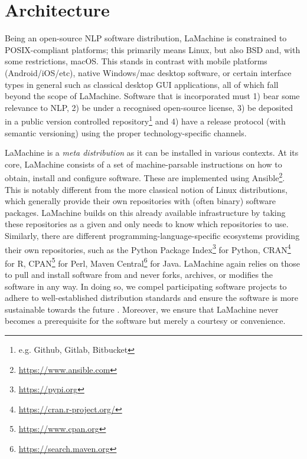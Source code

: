 \documentclass[a4paper,11pt]{article}
\begin{document}
\section{Architecture}

Being an open-source NLP software distribution, LaMachine is constrained to POSIX-compliant platforms; this primarily
means Linux, but also BSD and, with some restrictions, macOS. This stands in contrast with mobile platforms
(Android/iOS/etc), native Windows/mac desktop software, or certain interface types in general such as classical desktop
GUI applications, all of which fall beyond the scope of LaMachine. Software that is incorporated must 1) bear some
relevance to NLP, 2) be under a recognised open-source license, 3) be deposited in a public version controlled
repository\footnote{e.g. Github, Gitlab, Bitbucket} and 4) have a release protocol (with semantic versioning) using the
proper technology-specific channels.

LaMachine is a \emph{meta distribution} as it can be installed in various contexts. At its core, LaMachine consists of a
set of machine-parsable instructions on how to obtain, install and configure software. These are implemented using
Ansible\footnote{\url{https://www.ansible.com}}.  This is notably different from the more classical notion of Linux
distributions, which generally provide their own repositories with (often binary) software packages. LaMachine builds on
this already available infrastructure by taking these repositories as a given and only needs to know which
repositories to use.  Similarly, there are different programming-language-specific ecosystems providing their own
repositories, such as the Python Package Index\footnote{\url{https://pypi.org}} for Python,
CRAN\footnote{\url{https://cran.r-project.org/}} for R, CPAN\footnote{\url{https://www.cpan.org}} for Perl, Maven
Central\footnote{\url{https://search.maven.org}} for Java.  LaMachine again relies on those to pull and install
software from and never forks, archives, or modifies the software in any way. In doing so, we compel participating
software projects to adhere to well-established distribution standards and ensure the software is more sustainable
towards the future \cite{softwarequality}. Moreover, we ensure that LaMachine never becomes a prerequisite for the software but merely a
courtesy or convenience.
\end{document}
